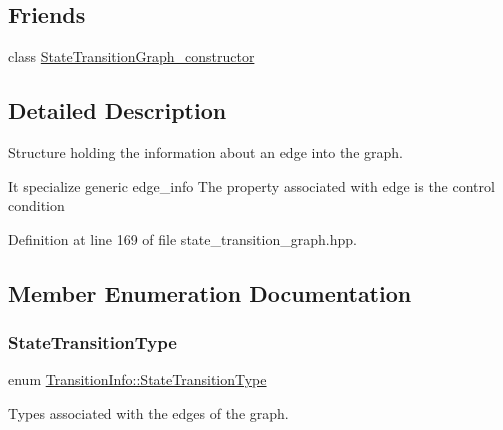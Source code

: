 \subsection*{Friends}
\begin{DoxyCompactItemize}
\item 
class \hyperlink{classTransitionInfo_ad763807d92353814f2f1e7839d7eb408}{State\+Transition\+Graph\+\_\+constructor}
\end{DoxyCompactItemize}


\subsection{Detailed Description}
Structure holding the information about an edge into the graph. 

It specialize generic edge\+\_\+info The property associated with edge is the control condition 

Definition at line 169 of file state\+\_\+transition\+\_\+graph.\+hpp.



\subsection{Member Enumeration Documentation}
\mbox{\label{classTransitionInfo_a5a56ae15f29949e7b9947f1134e6d7e8}} 
\subsubsection{\texorpdfstring{State\+Transition\+Type}{StateTransitionType}}
{\footnotesize\ttfamily enum \hyperlink{classTransitionInfo_a5a56ae15f29949e7b9947f1134e6d7e8}{Transition\+Info\+::\+State\+Transition\+Type}}



Types associated with the edges of the graph. 

